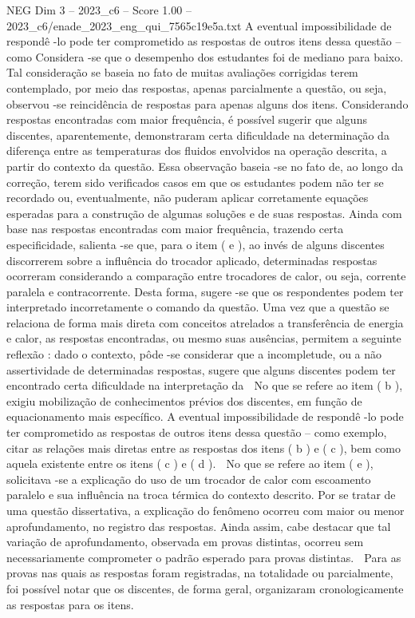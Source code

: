 \begin{textsample}{NEG Dim 3 – 2023\_c6 – Score 1.00 – 2023\_c6/enade\_2023\_eng\_qui\_7565c19e5a.txt}
A eventual impossibilidade de respondê -lo pode ter comprometido as respostas de outros itens dessa questão – como Considera -se que o desempenho dos estudantes foi de mediano para baixo.
Tal consideração se baseia no fato de muitas avaliações corrigidas terem contemplado, por meio das respostas, apenas parcialmente a questão, ou seja, observou -se reincidência de respostas para apenas alguns dos itens.
Considerando respostas encontradas com maior frequência, é possível sugerir que alguns discentes, aparentemente, demonstraram certa dificuldade na determinação da diferença entre as temperaturas dos fluidos envolvidos na operação descrita, a partir do contexto da questão.
Essa observação baseia -se no fato de, ao longo da correção, terem sido verificados casos em que os estudantes podem não ter se recordado ou, eventualmente, não puderam aplicar corretamente equações esperadas para a construção de algumas soluções e de suas respostas.
Ainda com base nas respostas encontradas com maior frequência, trazendo certa especificidade, salienta -se que, para o item ( e ), ao invés de alguns discentes discorrerem sobre a influência do trocador aplicado, determinadas respostas ocorreram considerando a comparação entre trocadores de calor, ou seja, corrente paralela e contracorrente.
Desta forma, sugere -se que os respondentes podem ter interpretado incorretamente o comando da questão.
Uma vez que a questão se relaciona de forma mais direta com conceitos atrelados a transferência de energia e calor, as respostas encontradas, ou mesmo suas ausências, permitem a seguinte reflexão : dado o contexto, pôde -se considerar que a incompletude, ou a não assertividade de determinadas respostas, sugere que alguns discentes podem ter encontrado certa dificuldade na interpretação da  No que se refere ao item ( b ), exigiu mobilização de conhecimentos prévios dos discentes, em função de equacionamento mais específico.
A eventual impossibilidade de respondê -lo pode ter comprometido as respostas de outros itens dessa questão – como exemplo, citar as relações mais diretas entre as respostas dos itens ( b ) e ( c ), bem como aquela existente entre os itens ( c ) e ( d ).  No que se refere ao item ( e ), solicitava -se a explicação do uso de um trocador de calor com escoamento paralelo e sua influência na troca térmica do contexto descrito.
Por se tratar de uma questão dissertativa, a explicação do fenômeno ocorreu com maior ou menor aprofundamento, no registro das respostas.
Ainda assim, cabe destacar que tal variação de aprofundamento, observada em provas distintas, ocorreu sem necessariamente comprometer o padrão esperado para provas distintas.  Para as provas nas quais as respostas foram registradas, na totalidade ou parcialmente, foi possível notar que os discentes, de forma geral, organizaram cronologicamente as respostas para os itens.

\end{textsample}
